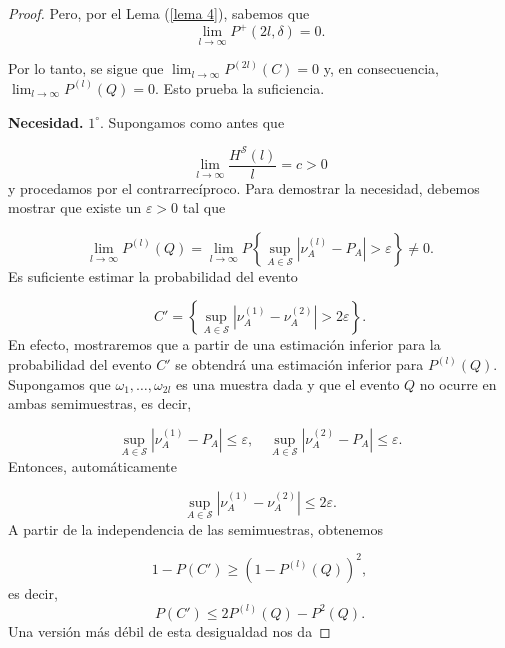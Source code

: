 \documentclass{report}
\begin{document}
\begin{proof}
Pero, por el Lema (\ref{lema 4}), sabemos que
\[ 
\lim_{l \to \infty} P^+(2l, \delta) = 0 .
\]

Por lo tanto, se sigue que \( \lim_{l \to \infty} P^{(2l)}(C) = 0 \) y, en consecuencia, \( \lim_{l \to \infty} P^{(l)}(Q) = 0 \). Esto prueba la suficiencia.\newline

\textbf{Necesidad.}\newline
\( 1^\circ \). Supongamos como antes que

\begin{equation}\label{eq 23}
\lim_{l \to \infty} \frac{H^{\mathcal{S}}(l)}{l} = c > 0
\end{equation}
y procedamos por el contrarrecíproco. Para demostrar la necesidad, debemos mostrar que existe un \( \varepsilon > 0 \) tal que

\begin{equation*}
\lim_{l \to \infty} P^{(l)}(Q) = \lim_{l \to \infty} P \left\{ \sup_{A \in \mathcal{S}} \left| \nu_A^{(l)} - P_A \right| > \varepsilon \right\} \neq 0.
\end{equation*}
Es suficiente estimar la probabilidad del evento

\begin{equation*}
C' = \left\{ \sup_{A \in \mathcal{S}} \left| \nu_A^{(1)} - \nu_A^{(2)} \right| > 2\varepsilon \right\}.
\end{equation*}
En efecto, mostraremos que a partir de una estimación inferior para la probabilidad del evento \( C' \) se obtendrá una estimación inferior para \( P^{(l)}(Q) \). Supongamos que \( \omega_1, \dots, \omega_{2l} \) es una muestra dada y que el evento \( Q \) no ocurre en ambas semimuestras, es decir,

\begin{equation*}
\sup_{A \in \mathcal{S}} \left| \nu_A^{(1)} - P_A \right| \leq \varepsilon, \quad \sup_{A \in \mathcal{S}} \left| \nu_A^{(2)} - P_A \right| \leq \varepsilon.
\end{equation*}
Entonces, automáticamente

\begin{equation*}
\sup_{A \in \mathcal{S}} \left| \nu_A^{(1)} - \nu_A^{(2)} \right| \leq 2\varepsilon.
\end{equation*}
A partir de la independencia de las semimuestras, obtenemos

\begin{equation*}
1 - P(C') \geq (1 - P^{(l)}(Q))^2, 
\end{equation*}
es decir, 
\[
P(C') \leq 2P^{(l)}(Q) - P^2(Q).
\]
Una versión más débil de esta desigualdad nos da


\end{proof}
\end{document}
